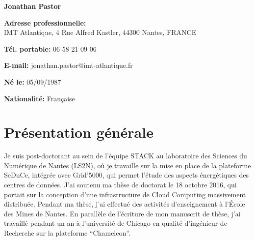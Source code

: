 \documentclass[french,11pt,a4paper]{moderncv}
\begin{document}
\makecvtitle

\vspace{-1.3cm}

\textbf{Jonathan Pastor}

\vspace{5mm} %

\textbf{Adresse professionnelle:}
\\
IMT Atlantique, 4 Rue Alfred Kastler, 44300 Nantes, FRANCE

\textbf{Tél. portable:} 06 58 21 09 06

\textbf{E-mail:} jonathan.pastor@imt-atlantique.fr

\textbf{Né le:} 05/09/1987

\textbf{Nationalité:} Française

\section{Présentation générale}

Je suis post-doctorant au sein de l'équipe STACK au laboratoire des
Sciences du Numérique de Nantes (LS2N), où je travaille sur la mise en
place de la plateforme SeDuCe, intégrée avec Grid'5000, qui permet
l'étude des aspects énergétiques des centres de données. J'ai soutenu
ma thèse de doctorat le 18 octobre 2016, qui portait sur la conception
d'une infrastructure de Cloud Computing massivement
distribuée. Pendant ma thèse, j'ai effectué des activités
d'enseignement à l'École des Mines de Nantes. En parallèle de
l'écriture de mon manuscrit de thèse, j'ai travaillé pendant un an à
l'université de Chicago en qualité d'ingénieur de Recherche sur la
plateforme ``Chameleon''.



\end{document}
